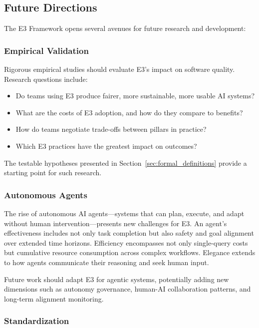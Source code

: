 \documentclass[11pt,a4paper]{article}
\begin{document}
\subsection{Future Directions}

The E3 Framework opens several avenues for future research and development:

\subsubsection{Empirical Validation}

Rigorous empirical studies should evaluate E3's impact on software quality. Research questions include:

\begin{itemize}[leftmargin=2em]
    \item Do teams using E3 produce fairer, more sustainable, more usable AI systems?
    \item What are the costs of E3 adoption, and how do they compare to benefits?
    \item How do teams negotiate trade-offs between pillars in practice?
    \item Which E3 practices have the greatest impact on outcomes?
\end{itemize}

The testable hypotheses presented in Section~\ref{sec:formal_definitions} provide a starting point for such research.

\subsubsection{Autonomous Agents}

The rise of autonomous AI agents---systems that can plan, execute, and adapt without human intervention---presents new challenges for E3. An agent's effectiveness includes not only task completion but also safety and goal alignment over extended time horizons. Efficiency encompasses not only single-query costs but cumulative resource consumption across complex workflows. Elegance extends to how agents communicate their reasoning and seek human input.

Future work should adapt E3 for agentic systems, potentially adding new dimensions such as autonomy governance, human-AI collaboration patterns, and long-term alignment monitoring.

\subsubsection{Standardization}
\end{document}
